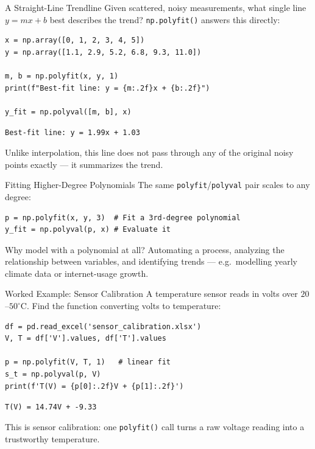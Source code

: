 \documentclass[9pt,aspectratio=169,xcolor=table]{beamer}
\begin{document}
\begin{frame}[fragile]{A Straight-Line Trendline}
    \leavevmode
    Given scattered, noisy measurements, what single line
    $y = mx + b$ best describes the trend? \texttt{np.polyfit()} answers
    this directly:

\begin{lstlisting}
x = np.array([0, 1, 2, 3, 4, 5])
y = np.array([1.1, 2.9, 5.2, 6.8, 9.3, 11.0])

m, b = np.polyfit(x, y, 1)
print(f"Best-fit line: y = {m:.2f}x + {b:.2f}")

y_fit = np.polyval([m, b], x)
\end{lstlisting}
    \texttt{Best-fit line: y = 1.99x + 1.03}

    \vspace{2mm}
    \small Unlike interpolation, this line does \alert{not} pass through
    any of the original noisy points exactly --- it summarizes the trend.
\end{frame}

\begin{frame}[fragile]{Fitting Higher-Degree Polynomials}
    \leavevmode
    The same \texttt{polyfit}/\texttt{polyval} pair scales to any degree:

\begin{lstlisting}
p = np.polyfit(x, y, 3)  # Fit a 3rd-degree polynomial
y_fit = np.polyval(p, x) # Evaluate it
\end{lstlisting}

    \vspace{2mm}
    \begin{block}{Why model with a polynomial at all?}
        \small Automating a process, analyzing the relationship between
        variables, and identifying trends --- e.g.\ modelling yearly
        climate data or internet-usage growth.
    \end{block}
\end{frame}

\begin{frame}[fragile]{Worked Example: Sensor Calibration}
    \leavevmode
    \small
    A temperature sensor reads in volts over $20$--$50^\circ$C. Find the
    function converting volts to temperature:

\begin{lstlisting}
df = pd.read_excel('sensor_calibration.xlsx')
V, T = df['V'].values, df['T'].values

p = np.polyfit(V, T, 1)   # linear fit
s_t = np.polyval(p, V)
print(f'T(V) = {p[0]:.2f}V + {p[1]:.2f}')
\end{lstlisting}
    \texttt{T(V) = 14.74V + -9.33}

    \vspace{2mm}
    \alert{This is sensor calibration}: one \texttt{polyfit()} call turns
    a raw voltage reading into a trustworthy temperature.
\end{frame}
\end{document}
